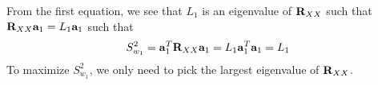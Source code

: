 From the first equation, we see that $L_1$ is an eigenvalue of $\mathbf{R}_{XX}$ such that $\mathbf{R}_{XX} \mathbf{a}_1 = L_1 \mathbf{a}_1$ such that
$$
S_{w_1}^2 = \mathbf{a}_1^T \mathbf{R}_{XX}\mathbf{a}_1 = L_1\mathbf{a}_1^T \mathbf{a}_1 = L_1
$$
To maximize $S_{w_1}^2$, we only need to pick the largest eigenvalue of $\mathbf{R}_{XX}$.













